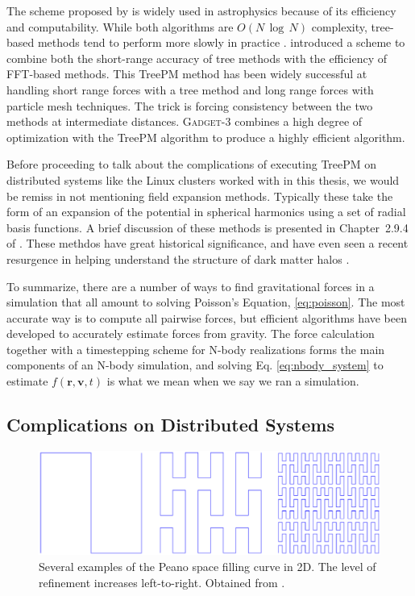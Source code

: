 The scheme proposed by \citet{barnes_hut} is widely used in astrophysics because of its efficiency and computability. While both algorithms are $O(N\,\log\, N)$ complexity, tree-based methods tend to perform more slowly in practice \citep{GadgetCodePaper}. \citet{xu_treepm} introduced a scheme to combine both the short-range accuracy of tree methods with the efficiency of FFT-based methods. This TreePM method has been widely successful at handling short range forces with a tree method and long range forces with particle mesh techniques. The trick is forcing consistency between the two methods at intermediate distances. \textsc{Gadget-3} combines a high degree of optimization with the TreePM algorithm to produce a highly efficient algorithm.

Before proceeding to talk about the complications of executing TreePM on distributed systems like the Linux clusters worked with in this thesis, we would be remiss in not mentioning field expansion methods. Typically these take the form of an expansion of the potential in spherical harmonics using a set of radial basis functions. A brief discussion of these methods is presented in Chapter~2.9.4 of \citet{BT}. These methdos have great historical significance, and have even seen a recent resurgence in helping understand the structure of dark matter halos \citep{lilley_2018_a, lilley_2018_b}.

To summarize, there are a number of ways to find gravitational forces in a simulation that all amount to solving Poisson's Equation, \eqref{eq:poisson}. The most accurate way is to compute all pairwise forces, but efficient algorithms have been developed to accurately estimate forces from gravity. The force calculation together with a timestepping scheme for N-body realizations forms the main components of an N-body simulation, and solving Eq. \eqref{eq:nbody_system} to estimate $f(\textbf{r},\textbf{v},t)$ is what we mean when we say we ran a simulation.

\subsection{Complications on Distributed Systems}

\begin{figure}
	\centering
	\includegraphics[width=\textwidth]{../figures/Peanocurve.eps}
	\caption{Several examples of the Peano space filling curve in 2D. The level of refinement increases left-to-right. Obtained from \citet{peano}.}\label{fig:peano}
\end{figure}

